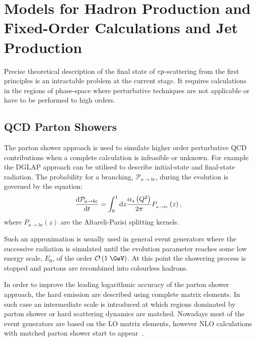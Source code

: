 \chapter{Models for Hadron Production and Fixed-Order Calculations and Jet Production}
Precise theoretical description of the final state of $\mbox{$e p$}$-scattering from the first principles is an intractable problem at the current stage. It requires calculations in the regions of phase-space where perturbative techniques are not applicable or have to be performed to high orders.
\section{QCD Parton Showers}
The parton shower approach is used to simulate higher order perturbative QCD contributions when a complete calculation is infeasible or unknown. For example the DGLAP approach can be utilised to describe initial-state and final-state radiation. The probability for a branching, $\mathcal{P}_{a\rightarrow bc}$, during the evolution is governed by the equation:
\begin{equation}
\frac{\mathrm{d}\mathcal{P}_{a\rightarrow bc}}{\mathrm{d}t} = \int_0^1{\mathrm{d}z\frac{\mbox{$\alpha_{s}$}\left(\mbox{${Q^2}$}\right)}{2\pi}P_{_{a\rightarrow bc}}}\left(z\right),
\end{equation}
where $P_{a\rightarrow bc}\left(z\right)$ are the Altareli-Parisi splitting kernels.

Such an approximation is usually used in general event generators where the successive radiation is simulated until the evolution parameter reaches some low energy scale, $E_0$, of the order $\mathcal{O}\left(1\;\GeV\right)$. At this point the showering process is stopped and partons are recombined into colourless hadrons.

In order to improve the leading logarithmic accuracy of the parton shower approach, the hard emission are described using complete matrix elements. In such case an intermediate scale is introduced at which regions dominated by parton shower or hard scattering dynamics are matched. Nowadays most of the event generators are based on the LO matrix elements, however NLO calculations with matched parton shower start to appear~\cite{powheg, mcatnlo}.


